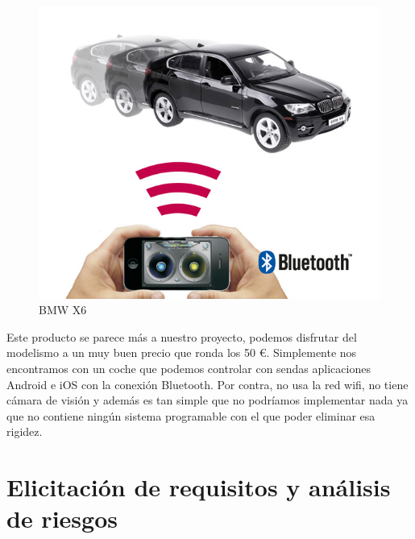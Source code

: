 \documentclass{pclass}
\begin{document}
\begin{figure}[H]
  \centering
    \includegraphics[width=1.2\textwidth]{img/producto2}
  \caption{BMW X6}
  \label{fig:BMWX6}
\end{figure}


Este producto se parece más a nuestro proyecto, podemos disfrutar del modelismo a un muy buen precio que ronda los 50 \euro. Simplemente nos encontramos con un coche que podemos controlar con sendas aplicaciones Android e iOS con la conexión Bluetooth. Por contra, no usa la red wifi, no tiene cámara de visión y además es tan simple que no podríamos implementar nada ya que no contiene ningún sistema programable con el que poder eliminar esa rigidez.



\section{Elicitación de requisitos y análisis de riesgos}
\end{document}
